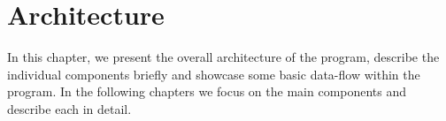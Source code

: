\chapter{Architecture}

In this chapter, we present the overall architecture of the program, describe the individual components briefly and showcase some basic data-flow within the program. In the following chapters we focus on the main components and describe each in detail.